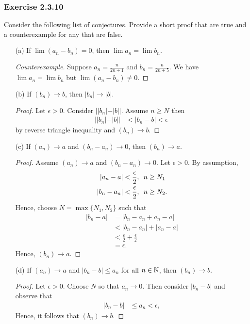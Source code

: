 \subsubsection{Exercise 2.3.10} Consider the following list of conjectures. Provide a short proof that are true and a counterexample for any that are false.
\begin{enumerate}
    \item[(a)] If \( \lim (a_n - b_n) = 0 \), then \( \lim a_n = \lim b_n\). 
        \begin{proof}[Counterexample]
        Suppose \( a_n = \frac{n}{2n+1}\) and \( b_n = \frac{n}{2n+5}\). We have \( \lim a_n = \lim b_n \) but \( \lim (a_n - b_n ) \neq 0\).
        \end{proof}
    \item[(b)] If \( (b_n) \to b\), then \( | b_n | \to | b |\).
        \begin{proof}
        Let \( \epsilon > 0\). Consider \( | |b_n| - |b|| \). Assume \( n \geq N \) then 
        \begin{align*}
           | |b_n| - |b|| &< | b_n - b| < \epsilon   \
        \end{align*}
        by reverse triangle inequality and \( (b_n) \to b\).
        \end{proof}
    \item[(c)] If \( (a_n) \to a\) and \( (b_n - a_n) \to 0\), then \( (b_n) \to a\).
        \begin{proof}
        Assume \( (a_n) \to a\) and \( (b_n - a_n) \to 0\). Let \( \epsilon  > 0\). By assumption, 
        \begin{align*}
            | a_n - a | &< \frac{ \epsilon }{2}  \text{,   \space  }  n \geq N_1\\
            | b_n - a_n | &< \frac{ \epsilon }{2} \text{, \space } n \geq N_2.
        \end{align*}
        Hence, choose \(  N = \max \{ N_1, N_2 \} \) such that 
        \begin{align*}
        | b_n - a |&= | b_n - a_n + a_n - a  | \\
                   &< | b_n - a_n | + | a_n - a | \\
                   &< \frac{ \epsilon }{2} + \frac{ \epsilon }{2} \\ 
                   &= \epsilon. 
        \end{align*}
        Hence, \( (b_n) \to a\).
        \end{proof}
    \item[(d)]If \( (a_n) \to a\) and \( | b_n - b | \leq a_n \) for all \( n \in \mathbb{N} \), then \( (b_n) \to b\).
        \begin{proof}
        Let \( \epsilon > 0\). Choose \( N \) so that \( a_n \to 0 \). Then consider \( |b_n - b |\) and observe that
        \begin{align*}
        | b_n - b| &\leq a_n < \epsilon, 
        \end{align*}
        Hence, it follows that \( (b_n ) \to b\).
        \end{proof}
\end{enumerate}

